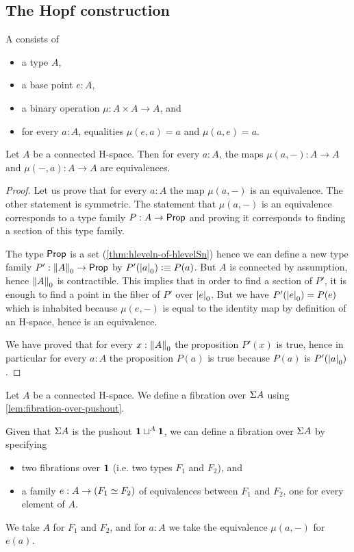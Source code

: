 \subsection{The Hopf construction}

\begin{defn}
  A  consists of
  \begin{itemize}
  \item a type $A$,
  \item a base point $e:A$,
  \item a binary operation $\mu:A\times A\to A$, and
  \item for every $a:A$, equalities $\mu(e,a)=a$ and $\mu(a,e)=a$.
  \end{itemize}
\end{defn}

\begin{lem}
  Let $A$ be a connected H-space. Then for every $a:A$, the maps $\mu(a,-):A\to
  A$ and $\mu(-,a):A\to A$ are equivalences.
\end{lem}

\begin{proof}
  Let us prove that for every $a:A$ the map $\mu(a,-)$ is an equivalence. The
  other statement is symmetric.
  The statement that $\mu(a,-)$ is an equivalence corresponds to a type family
  $P:A\to\prop$ and proving it corresponds to finding a section of this type
  family.

  The type $\prop$ is a set (\autoref{thm:hleveln-of-hlevelSn}) hence we can
  define a new type family $P':\trunc0A\to\prop$ by $P'(\tproj0a)\defeq
  P(a)$. But $A$ is connected by assumption, hence $\trunc0A$ is
  contractible. This implies that in order to find a section of $P'$, it is
  enough to find a point in the fiber of $P'$ over $\tproj0e$. But we have
  $P'(\tproj0e)=P(e)$ which is inhabited because $\mu(e,-)$ is equal to the
  identity map by definition of an H-space, hence is an equivalence.

  We have proved that for every $x:\trunc0A$ the proposition $P'(x)$ is true,
  hence in particular for every $a:A$ the proposition $P(a)$ is true because
  $P(a)$ is $P'(\tproj0a)$.
\end{proof}

\begin{defn}
  Let $A$ be a connected H-space. We define a fibration over $\susp A$ using
  \autoref{lem:fibration-over-pushout}.

  Given that $\susp A$ is the pushout $\unit\sqcup^A\unit$, we can define a
  fibration over $\susp A$ by specifying
  \begin{itemize}
  \item two fibrations over $\unit$ (i.e. two types $F_1$ and $F_2$), and
  \item a family $e:A\to(\eqv{F_1}{F_2})$ of equivalences between
    $F_1$ and $F_2$, one for every element of $A$.
  \end{itemize}
  We take $A$ for $F_1$ and $F_2$, and for $a:A$ we take the equivalence
  $\mu(a,-)$ for $e(a)$.
\end{defn}

